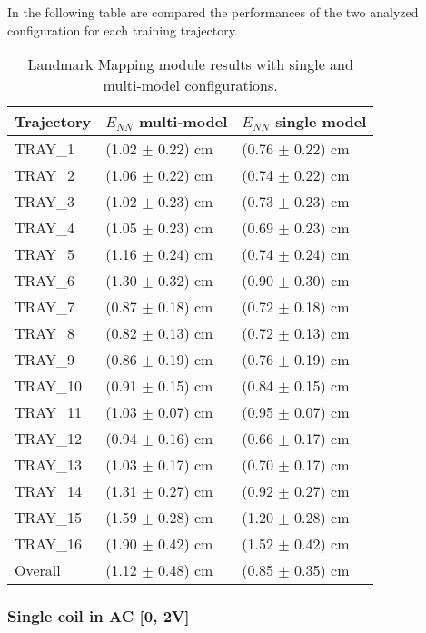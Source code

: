 In the following table are compared the performances of the two analyzed configuration for each training trajectory.
\begin{table}[H]
\label{tab:3DErrorResultTrain}
\centering
\begin{tabular}{l | l l }
\toprule
Trajectory & $E_{NN}$ multi-model & $E_{NN}$ single model\\
\midrule
TRAY\_1 & (1.02 $\pm$ 0.22) cm & (0.76 $\pm$ 0.22) cm\\
TRAY\_2 & (1.06 $\pm$ 0.22) cm & (0.74 $\pm$ 0.22) cm \\
TRAY\_3 & (1.02 $\pm$ 0.23) cm & (0.73 $\pm$ 0.23) cm \\
TRAY\_4 & (1.05 $\pm$ 0.23) cm & (0.69 $\pm$ 0.23) cm \\
TRAY\_5 & (1.16 $\pm$ 0.24) cm & (0.74 $\pm$ 0.24) cm \\
TRAY\_6 & (1.30 $\pm$ 0.32) cm & (0.90 $\pm$ 0.30) cm \\
TRAY\_7 & (0.87 $\pm$ 0.18) cm & (0.72 $\pm$ 0.18) cm \\
TRAY\_8 & (0.82 $\pm$ 0.13) cm & (0.72 $\pm$ 0.13) cm \\
TRAY\_9 & (0.86 $\pm$ 0.19) cm & (0.76 $\pm$ 0.19) cm \\
TRAY\_10 & (0.91 $\pm$ 0.15) cm & (0.84 $\pm$ 0.15) cm \\
TRAY\_11 & (1.03 $\pm$ 0.07) cm & (0.95 $\pm$ 0.07) cm \\
TRAY\_12 & (0.94 $\pm$ 0.16) cm & (0.66 $\pm$ 0.17) cm \\
TRAY\_13 & (1.03 $\pm$ 0.17) cm & (0.70 $\pm$ 0.17) cm \\
TRAY\_14 & (1.31 $\pm$ 0.27) cm & (0.92 $\pm$ 0.27) cm \\
TRAY\_15 & (1.59 $\pm$ 0.28) cm & (1.20 $\pm$ 0.28) cm \\
TRAY\_16 & (1.90 $\pm$ 0.42) cm & (1.52 $\pm$ 0.42) cm \\
\midrule
Overall & (1.12 $\pm$ 0.48) cm & (0.85 $\pm$ 0.35) cm \\
\bottomrule
\end{tabular}
\caption{Landmark Mapping module results with single and multi-model configurations.}
\end{table}

\newpage

\subsubsection{Single coil in AC [0, 2V]}

